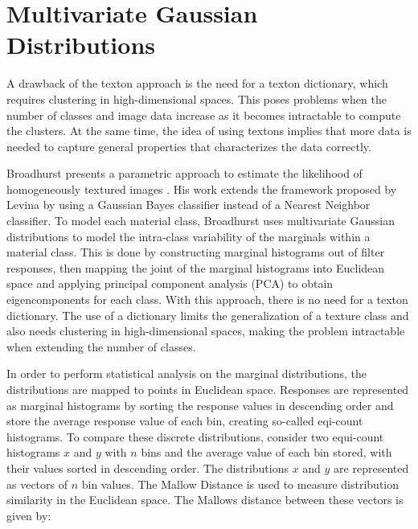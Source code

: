 \section{Multivariate Gaussian Distributions}\label{sec:MGD}
A drawback of the texton approach is the need for a texton dictionary, which requires clustering in high-dimensional spaces. This poses problems when the number of classes and image data increase as it becomes intractable to compute the clusters. At the same time, the idea of using textons implies that more data is needed to capture general properties that characterizes the data correctly.

Broadhurst presents a parametric approach to estimate the likelihood of homogeneously textured images \cite{Broadhurst}. His work extends the framework proposed by Levina \cite{Levina} by using a Gaussian Bayes classifier instead of a Nearest Neighbor classifier. To model each material class, Broadhurst uses multivariate Gaussian distributions to model the intra-class variability of the marginals within a material class. This is done by constructing marginal histograms out of filter responses, then mapping the joint of the marginal histograms into Euclidean space and applying principal component analysis (PCA) to obtain eigencomponents for each class. With this approach, there is no need for a texton dictionary. The use of a dictionary limits the generalization of a texture class and also needs clustering in high-dimensional spaces, making the problem intractable when extending the number of classes. 


In order to perform statistical analysis on the marginal distributions, the distributions are mapped to points in Euclidean space. Responses are represented as marginal histograms by sorting the response values in descending order and store the average response value of each bin, creating so-called eqi-count histograms. To compare these discrete distributions, consider two equi-count histograms $x$ and $y$ with $n$ bins and the average value of each bin stored, with their values sorted in descending order. The distributions $x$ and $y$ are represented as vectors of $n$ bin values. The Mallow Distance is used to measure distribution similarity in the Euclidean space. The Mallows distance between these vectors is given by:

